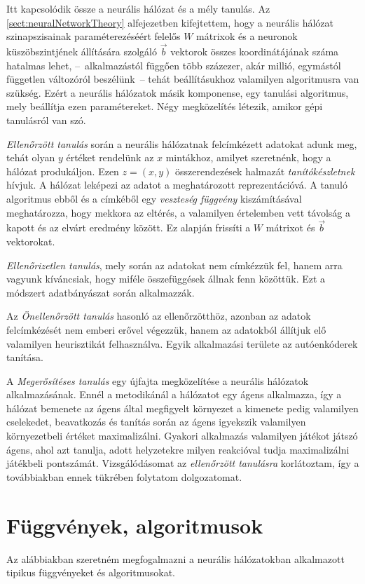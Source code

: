 Itt kapcsolódik össze a neurális hálózat és a mély tanulás. Az \ref{sect:neuralNetworkTheory} alfejezetben kifejtettem, hogy a neurális hálózat szinapszisainak paraméterezéséért felelős $W$ mátrixok és a neuronok küszöbszintjének állítására szolgáló $\vec{b}$ vektorok összes koordinátájának száma hatalmas lehet, --~alkalmazástól függően több százezer, akár millió, egymástól független változóról beszélünk~-- tehát beállításukhoz valamilyen algoritmusra van szükség. Ezért a neurális hálózatok másik komponense, egy tanulási algoritmus, mely beállítja ezen paramétereket. Négy  megközelítés létezik, amikor gépi tanulásról van szó.

\emph{Ellenőrzött tanulás} során a neurális hálózatnak felcímkézett adatokat adunk meg, tehát olyan $y$ értéket  rendelünk az $x$ mintákhoz, amilyet szeretnénk, hogy a hálózat produkáljon. Ezen $z=(x,y)$ összerendezések halmazát \emph{tanítókészletnek} hívjuk. A hálózat leképezi az adatot a meghatározott reprezentációvá. A tanuló algoritmus ebből és a címkéből egy \emph{veszteség függvény} kiszámításával meghatározza, hogy mekkora az eltérés, a valamilyen értelemben vett távolság a kapott és az elvárt eredmény között. Ez alapján frissíti a $W$ mátrixot és $\vec{b}$ vektorokat.

\emph{Ellenőrizetlen tanulás}, mely során az adatokat nem címkézzük fel, hanem arra vagyunk kíváncsiak, hogy miféle összefüggések állnak fenn közöttük. Ezt a módszert adatbányászat során alkalmazzák. 

Az \emph{Önellenőrzött tanulás} hasonló az ellenőrzötthöz, azonban az adatok felcímkézését nem emberi erővel végezzük, hanem az adatokból állítjuk elő valamilyen heurisztikát felhasználva. Egyik alkalmazási területe az autóenkóderek tanítása.

A \emph{Megerősítéses tanulás} egy újfajta megközelítése a neurális hálózatok alkalmazásának. Ennél a metodikánál a hálózatot egy ágens alkalmazza, így a hálózat bemenete az ágens által megfigyelt környezet a kimenete pedig valamilyen cselekedet, beavatkozás és tanítás során az ágens igyekszik valamilyen környezetbeli értéket maximalizálni. Gyakori alkalmazás valamilyen játékot játszó ágens, ahol azt tanulja, adott helyzetekre milyen reakcióval tudja maximalizálni játékbeli pontszámát.
Vizsgálódásomat az \emph{ellenőrzött tanulásra} korlátoztam, így a továbbiakban ennek tükrében folytatom dolgozatomat.

\section{Függvények, algoritmusok}\label{sec:fuggvenyek-algoritmusok}
Az alábbiakban szeretném megfogalmazni a neurális hálózatokban alkalmazott tipikus függvényeket és algoritmusokat.

